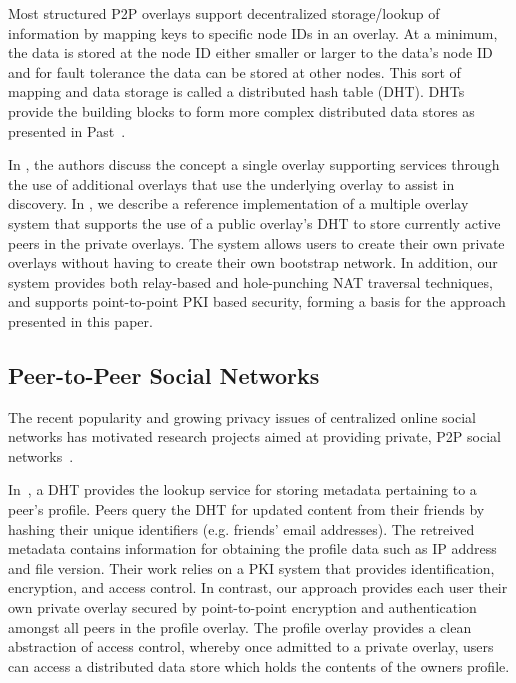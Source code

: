 \documentclass[letterpaper,twocolumn,10pt]{article}
\begin{document}
Most structured P2P overlays support decentralized storage/lookup of information by
mapping keys to specific node IDs in an overlay.  At a minimum, the data is stored
at the node ID either smaller or larger to the data's node ID and for fault
tolerance the data can be stored at other nodes.  This sort of mapping
and data storage is called a distributed hash table (DHT).  DHTs provide the
building blocks to form more complex distributed data stores as presented in
Past~\cite{past}.

In \cite{one_ring, randpeer, can_multicast}, the authors discuss the concept a
single overlay supporting services through the use of additional overlays
that use the underlying overlay to assist in discovery.  In \cite{icdcs10}, we
describe a reference implementation of a multiple overlay system that supports
the use of a public overlay's DHT to store currently active peers in the private
overlays. The system allows users to create their own private overlays without having to
create their own bootstrap network.  In addition, our system provides both relay-based
and hole-punching NAT traversal techniques, and supports point-to-point PKI
based security, forming a basis for the approach presented in this paper.

\subsection{Peer-to-Peer Social Networks}
The recent popularity and growing privacy issues of centralized online social
networks has motivated research projects aimed at providing private, P2P social
networks~\cite{peerson, matryoshka, tribler-osn, vis-a-vis}.

In~\cite{peerson}, a DHT provides the lookup service for storing metadata
pertaining to a peer's profile. Peers query the DHT for updated content from 
their friends by hashing their unique identifiers (e.g. friends' email
addresses).  The retreived metadata contains information for obtaining the
profile data such as IP address and file version. Their work relies
on a PKI system that provides identification, encryption, and access control.
In contrast, our approach provides each user their own private overlay secured
by point-to-point encryption and authentication amongst all peers in the profile
overlay.  The profile overlay provides a clean abstraction of access control,
whereby once admitted to a private overlay, users can access a distributed data
store which holds the contents of the owners profile.
\end{document}
